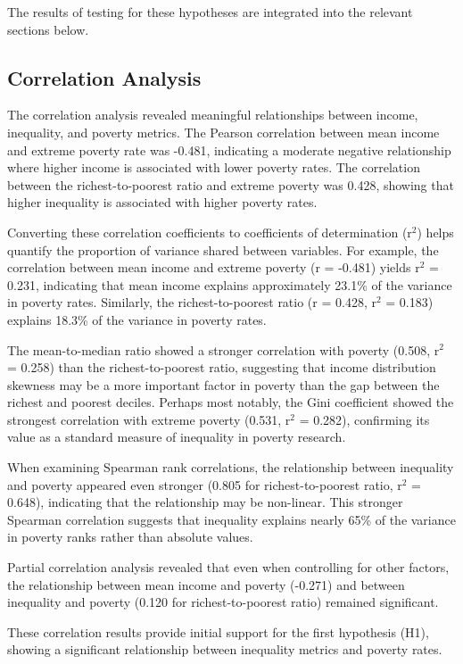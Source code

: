 \documentclass[12pt,a4paper]{article}
\begin{document}
The results of testing for these hypotheses are integrated into the relevant sections below.

\subsection{Correlation Analysis}
The correlation analysis revealed meaningful relationships between income, inequality, and poverty metrics. The Pearson correlation between mean income and extreme poverty rate was -0.481, indicating a moderate negative relationship where higher income is associated with lower poverty rates. The correlation between the richest-to-poorest ratio and extreme poverty was 0.428, showing that higher inequality is associated with higher poverty rates.

Converting these correlation coefficients to coefficients of determination (r$^2$) helps quantify the proportion of variance shared between variables. For example, the correlation between mean income and extreme poverty (r = -0.481) yields r$^2$ = 0.231, indicating that mean income explains approximately 23.1\% of the variance in poverty rates. Similarly, the richest-to-poorest ratio (r = 0.428, r$^2$ = 0.183) explains 18.3\% of the variance in poverty rates.

The mean-to-median ratio showed a stronger correlation with poverty (0.508, r$^2$ = 0.258) than the richest-to-poorest ratio, suggesting that income distribution skewness may be a more important factor in poverty than the gap between the richest and poorest deciles. Perhaps most notably, the Gini coefficient showed the strongest correlation with extreme poverty (0.531, r$^2$ = 0.282), confirming its value as a standard measure of inequality in poverty research.

When examining Spearman rank correlations, the relationship between inequality and poverty appeared even stronger (0.805 for richest-to-poorest ratio, r$^2$ = 0.648), indicating that the relationship may be non-linear. This stronger Spearman correlation suggests that inequality explains nearly 65\% of the variance in poverty ranks rather than absolute values.

Partial correlation analysis revealed that even when controlling for other factors, the relationship between mean income and poverty (-0.271) and between inequality and poverty (0.120 for richest-to-poorest ratio) remained significant.

These correlation results provide initial support for the first hypothesis (H1), showing a significant relationship between inequality metrics and poverty rates.
\end{document}
